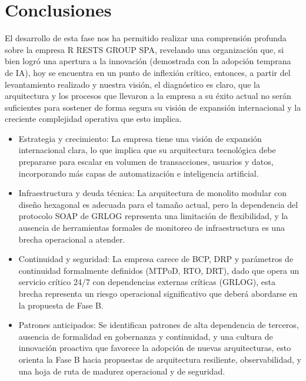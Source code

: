 \documentclass[12pt]{article}
\begin{document}
\newpage

\section{Conclusiones}

El desarrollo de esta fase nos ha permitido realizar una comprensi\'on profunda sobre la empresa R RESTS
GROUP SPA, revelando una organizaci\'on que, si bien logró una
apertura a la innovaci\'on (demostrada con la adopci\'on temprana de IA), hoy se encuentra en un 
punto de inflexi\'on cr\'itico, entonces, a partir del levantamiento realizado y nuestra visi\'on, el diagn\'ostico
es claro, que la arquitectura y los procesos que llevaron a la empresa a su \'exito actual no ser\'an suficientes
para sostener de forma segura su visi\'on de expansi\'on internacional y la creciente complejidad operativa 
que esto implica.


\begin{itemize}[leftmargin=1.5em]
    \item Estrategia y crecimiento: La empresa tiene una visi\'on de expansi\'on
    internacional clara, lo que implica que su arquitectura tecnol\'ogica debe prepararse
    para escalar en volumen de transacciones, usuarios y datos, incorporando m\'as capas
    de automatizaci\'on e inteligencia artificial.

    \item Infraestructura y deuda t\'ecnica: La arquitectura de monolito modular
    con dise\~no hexagonal es adecuada para el tama\~no actual, pero la dependencia del
    protocolo SOAP de GRLOG representa una limitaci\'on de flexibilidad, y la ausencia de
    herramientas formales de monitoreo de infraestructura es una brecha operacional a atender.

    \item Continuidad y seguridad: La empresa carece de BCP, DRP y par\'ametros
    de continuidad formalmente definidos (MTPoD, RTO, DRT), dado que opera un servicio
    cr\'itico 24/7 con dependencias externas cr\'iticas (GRLOG), esta brecha representa
    un riesgo operacional significativo que deber\'a abordarse en la propuesta de Fase B.

    \item Patrones anticipados: Se identifican patrones de alta dependencia de
    terceros, ausencia de formalidad en gobernanza y continuidad, y una cultura de
    innovaci\'on proactiva que favorece la adopci\'on de nuevas arquitecturas, esto orienta
    la Fase B hacia propuestas de arquitectura resiliente, observabilidad, y una hoja de
    ruta de madurez operacional y de seguridad.
\end{itemize}
\end{document}
